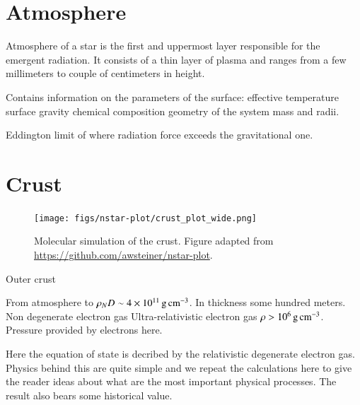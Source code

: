 \section{Atmosphere}\label{sect:atmos}

Atmosphere of a star is the first and uppermost layer responsible for the emergent radiation.
It consists of a thin layer of plasma and ranges from a few millimeters to couple of centimeters in height.


Contains information on the parameters of the surface:
effective temperature
surface gravity
chemical composition
geometry of the system
mass and radii.


Eddington limit of where radiation force exceeds the gravitational one.


\section{Crust}

\begin{figure}
\centering
\texttt{[image: figs/nstar-plot/crust\_plot\_wide.png]}
\caption{\label{fig:crust}
Molecular simulation of the crust.
Figure adapted from \url{https://github.com/awsteiner/nstar-plot}.
}
\end{figure}

Outer crust

From atmosphere to $\rho_ND \sim 4 \times 10^{11} \, \mathrm{g}\,\mathrm{cm}^{-3}$.
In thickness some hundred meters.
Non degenerate electron gas
Ultra-relativistic electron gas $\rho > 10^6 \, \mathrm{g}\,\mathrm{cm}^{-3}$.
Pressure provided by electrons here.

Here the equation of state is decribed by the relativistic degenerate electron gas.
Physics behind this are quite simple and we repeat the calculations here to give the reader ideas about what are the most important physical processes.
The result also bears some historical value.

